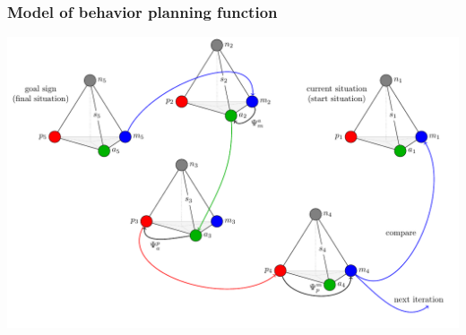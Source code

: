 \documentclass[default]{beamer}
\begin{document}
	\begin{frame}
		\frametitle{Model of behavior planning function}
		\centering
		\includegraphics[width=\textwidth]{algo/plan_alg}
	\end{frame}	
\end{document}
